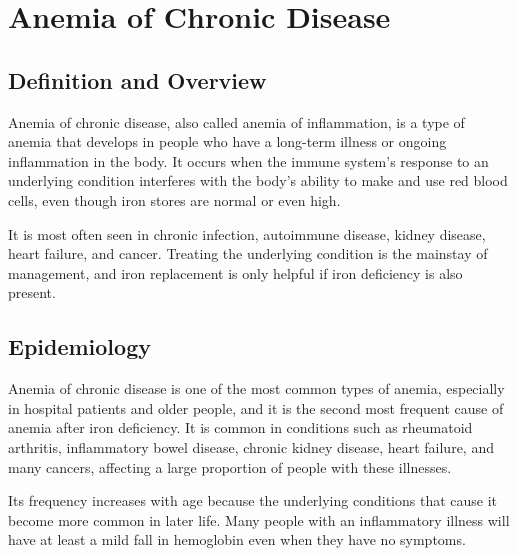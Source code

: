 \chapter{Anemia of Chronic Disease}

\section*{Definition and Overview}
Anemia of chronic disease, also called anemia of inflammation, is a type of anemia that develops in people who have a long-term illness or ongoing inflammation in the body. It occurs when the immune system's response to an underlying condition interferes with the body's ability to make and use red blood cells, even though iron stores are normal or even high.

It is most often seen in chronic infection, autoimmune disease, kidney disease, heart failure, and cancer. Treating the underlying condition is the mainstay of management, and iron replacement is only helpful if iron deficiency is also present.

\section*{Epidemiology}
Anemia of chronic disease is one of the most common types of anemia, especially in hospital patients and older people, and it is the second most frequent cause of anemia after iron deficiency. It is common in conditions such as rheumatoid arthritis, inflammatory bowel disease, chronic kidney disease, heart failure, and many cancers, affecting a large proportion of people with these illnesses.

Its frequency increases with age because the underlying conditions that cause it become more common in later life. Many people with an inflammatory illness will have at least a mild fall in hemoglobin even when they have no symptoms.

